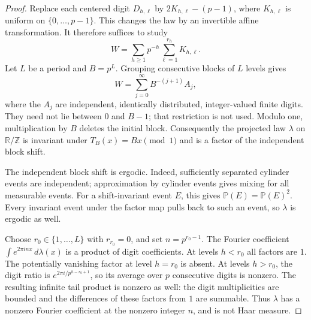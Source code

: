 \documentclass[11pt,a4paper]{article}
\theoremstyle{remark}
\newcommand{\T}{\mathbb R/\mathbb Z}
\newcommand{\Prob}{\mathbb P}
\begin{document}
\begin{proof}
Replace each centered digit $D_{h,\ell}$ by $2K_{h,\ell}-(p-1)$, where
$K_{h,\ell}$ is uniform on $\{0,\ldots,p-1\}$. This changes the law by an
invertible affine transformation. It therefore suffices to study
\[
 W=\sum_{h\ge1}p^{-h}\sum_{\ell=1}^{r_h}K_{h,\ell}.
\]
Let $L$ be a period and $B=p^L$. Grouping consecutive blocks of $L$ levels gives
\begin{equation}
 W=\sum_{j=0}^{\infty}B^{-(j+1)}A_j,
 \label{eq:block-digits}
\end{equation}
where the $A_j$ are independent, identically distributed, integer-valued finite
digits. They need not lie between $0$ and $B-1$; that restriction is not used.
Modulo one, multiplication by $B$ deletes the initial block. Consequently the
projected law $\lambda$ on $\T$ is invariant under $T_B(x)=Bx\pmod1$ and is a
factor of the independent block shift.

The independent block shift is ergodic. Indeed, sufficiently separated cylinder
events are independent; approximation by cylinder events gives mixing for all
measurable events. For a shift-invariant event $E$, this gives
$\Prob(E)=\Prob(E)^2$. Every invariant event under the factor map pulls back
to such an event, so $\lambda$ is ergodic as well.

Choose $r_0\in\{1,\ldots,L\}$ with $r_{r_0}=0$, and set $n=p^{r_0-1}$.
The Fourier coefficient $\int e^{2\pi inx}\,d\lambda(x)$ is a product of digit
coefficients. At levels $h<r_0$ all factors are $1$. The potentially vanishing
factor at level $h=r_0$ is absent. At levels $h>r_0$, the digit ratio is
$e^{2\pi i/p^{h-r_0+1}}$, so its average over $p$ consecutive digits is
nonzero. The resulting infinite tail product is nonzero as well: the digit
multiplicities are bounded and the differences of these factors from $1$ are
summable. Thus $\lambda$ has a nonzero Fourier coefficient at the nonzero
integer $n$, and is not Haar measure.


\end{proof}
\end{document}
